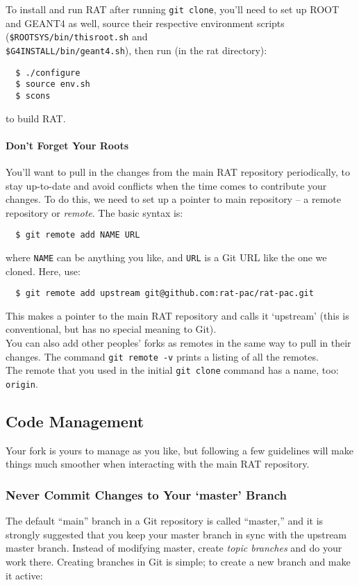 \documentclass{article}
\begin{document}
To install and run RAT after running {\tt git clone},
you'll need to set up ROOT and GEANT4 as well, source their respective
environment scripts ({\tt \$ROOTSYS/bin/thisroot.sh} and\\
{\tt \$G4INSTALL/bin/geant4.sh}), then run (in the rat directory):
\begin{verbatim}
  $ ./configure
  $ source env.sh
  $ scons
\end{verbatim}
to build RAT.

\paragraph{Don't Forget Your Roots}
You'll want to pull in the changes from the main RAT repository periodically,
to stay up-to-date and avoid conflicts when the time comes to contribute your
changes. To do this, we need to set up a pointer to main repository -- a
remote repository or {\it remote}. The basic syntax is:

\begin{verbatim}
  $ git remote add NAME URL
\end{verbatim}
where {\tt NAME} can be anything you like, and {\tt URL} is a Git URL like the
one we cloned. Here, use:
\begin{verbatim}
  $ git remote add upstream git@github.com:rat-pac/rat-pac.git
\end{verbatim}
This makes a pointer to the main RAT repository and calls it `upstream' (this
is conventional, but has no special meaning to Git).\\

You can also add other peoples' forks as remotes in the same way to pull in
their changes. The command {\tt git remote -v} prints a listing of all the
remotes.\\

The remote that you used in the initial {\tt git clone} command has a name,
too: {\tt origin}.

\subsection{Code Management}
Your fork is yours to manage as you like, but following a few guidelines will
make things much smoother when interacting with the main RAT repository.

\subsubsection{Never Commit Changes to Your `master' Branch} The default ``main''
branch in a Git repository is called ``master,'' and it is strongly suggested
that you keep your master branch in sync with the upstream master branch.
Instead
of modifying master, create {\it topic branches} and do your work there.
Creating branches in Git is simple; to create a new branch and make it active:
\end{document}
